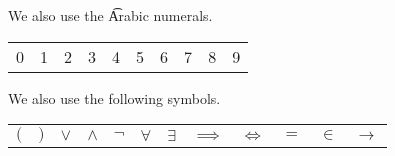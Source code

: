 
We also use the \t{Arabic numerals}.
\begin{center}
\begin{tabular}{cccccccccc}
  0 & 1 & 2 & 3 & 4 & 5 & 6 & 7 & 8 & 9\\
\end{tabular}
\end{center}


We also use the following symbols.
\begin{center}
\begin{tabular}{cccccccccccc}
  $($ & $)$ & $\lor$ & $\land$ & $\neg$ & $\forall$ & $\exists$ & $\implies$ & $\iff$ & $=$ & $\in$ & $\to$
\end{tabular}
\end{center}







